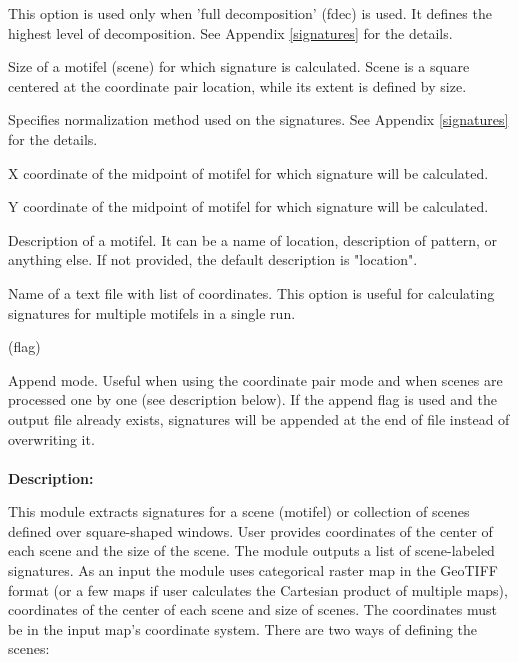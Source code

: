 
This option is used only when 'full decomposition' (fdec) is used.
It defines the highest level of decomposition.
See Appendix \ref{signatures} for the details.


Size of a motifel (scene) for which signature is calculated.
Scene is a square centered at the coordinate pair location, while its extent is defined by size. 


Specifies normalization method used on the signatures. 
See Appendix \ref{signatures} for the details.


X coordinate of the midpoint of motifel for which signature will be calculated.


Y coordinate of the midpoint of motifel for which signature will be calculated.


Description of a motifel.
It can be a name of location, description of pattern, or anything else. 
If not provided, the default description is "location".


Name of a text file with list of coordinates. 
This option is useful for calculating signatures for multiple motifels in a single run. 

 (flag)

Append mode. 
Useful when using the coordinate pair mode and when scenes are processed one by one (see description below). 
If the append flag is used and the output file already exists, signatures will be appended at the end of file instead of overwriting it.
\\\\
{\bf Description:}

This module extracts signatures for a scene (motifel) or collection of scenes defined over square-shaped windows.
User provides coordinates of the center of each scene and the size of the scene. 
The module outputs a list of scene-labeled signatures.
As an input the module uses categorical raster map in the GeoTIFF format (or a few maps if user calculates the Cartesian product of multiple maps), coordinates of the center of each scene and size of scenes. 
The coordinates must be in the input map's coordinate system. 
There are two ways of defining the scenes:

